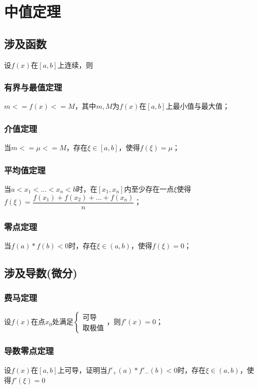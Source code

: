 
\chapter{中值定理}

\section{涉及函数}
设\(f(x)\)在\([a, b]\)上连续，则

\subsection{有界与最值定理}
\(m <= f(x) <= M\)，其中\(m, M\)为\(f(x)\)在\([a, b]\)上最小值与最大值；

\subsection{介值定理}
当\(m <= \mu <= M\)，存在\(\xi \in [a, b]\)，使得\(f(\xi) = \mu\)；

\subsection{平均值定理}
当\(a < x_1 < ... < x_n < b\)时，在\([x_1, x_n]\)内至少存在一点\(\xi\)使得\(f(\xi) = \dfrac{f(x_1) + f(x_2) + ... + f(x_n)}{n}\)；

\subsection{零点定理}
当\(f(a) * f(b) < 0\)时，存在\(\xi \in (a, b)\)，使得\(f(\xi) = 0\)；


\section{涉及导数(微分)}

\subsection{费马定理}
设\(f(x)\)在点\(x_0\)处满足\(\begin{cases}
\text{可导} \\ 
\text{取极值}
\end{cases}\)，则\(f'(x) = 0\)；


\subsection{导数零点定理}
设\(f(x)\)在\([a, b]\)上可导，证明当\(f'_+(a) * f'_-(b) < 0\)时，存在\(\xi \in (a, b)\)，使得\(f'(\xi) = 0\)


